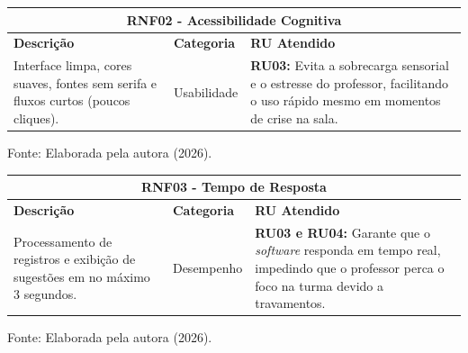 \begin{quadro}[H]
    \centering
    \caption{RNF02: Acessibilidade Cognitiva}
    \label{quadro:rnf02}
    \renewcommand{\arraystretch}{1.5}
    \begin{tabular}{|p{5.5cm}|p{2.5cm}|p{7cm}|}
        \hline
        \multicolumn{3}{|c|}{\textbf{RNF02 - Acessibilidade Cognitiva}} \\ \hline
        \textbf{Descrição} & \textbf{Categoria} & \textbf{RU Atendido} \\ \hline
        Interface limpa, cores suaves, fontes sem serifa e fluxos curtos (poucos cliques). & Usabilidade & \textbf{RU03:} Evita a sobrecarga sensorial e o estresse do professor, facilitando o uso rápido mesmo em momentos de crise na sala. \\ \hline
    \end{tabular}
    
    \vspace{0.1cm}
    \begin{flushleft}
        \footnotesize Fonte: Elaborada pela autora (2026).
    \end{flushleft}
\end{quadro}

\begin{quadro}[H]
    \centering
    \caption{RNF03: Tempo de Resposta}
    \label{quadro:rnf03}
    \renewcommand{\arraystretch}{1.5}
    \begin{tabular}{|p{5.5cm}|p{2.5cm}|p{7cm}|}
        \hline
        \multicolumn{3}{|c|}{\textbf{RNF03 - Tempo de Resposta}} \\ \hline
        \textbf{Descrição} & \textbf{Categoria} & \textbf{RU Atendido} \\ \hline
        Processamento de registros e exibição de sugestões em no máximo 3 segundos. & Desempenho & \textbf{RU03 e RU04:} Garante que o \textit{software} responda em tempo real, impedindo que o professor perca o foco na turma devido a travamentos. \\ \hline
    \end{tabular}
    
    \vspace{0.1cm}
    \begin{flushleft}
        \footnotesize Fonte: Elaborada pela autora (2026).
    \end{flushleft}
\end{quadro}

